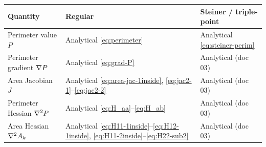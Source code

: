 \documentclass[11pt,a4paper]{article}
\begin{document}
\begin{center}
\renewcommand{\arraystretch}{1.35}
\begin{tabular}{p{4.2cm}p{4.5cm}p{4.5cm}}
\toprule
\textbf{Quantity} & \textbf{Regular} & \textbf{Steiner / triple-point} \\
\midrule
Perimeter value $P$
  & Analytical \eqref{eq:perimeter}
  & Analytical \eqref{eq:steiner-perim} \\
Perimeter gradient $\nabla P$
  & Analytical \eqref{eq:grad-P}
  & Analytical (doc 03) \\
Area Jacobian $J$
  & Analytical \eqref{eq:area-jac-1inside}, \eqref{eq:jac2-1}--\eqref{eq:jac2-2}
  & Analytical (doc 03) \\
Perimeter Hessian $\nabla^2 P$
  & Analytical \eqref{eq:H_aa}--\eqref{eq:H_ab}
  & Analytical (doc 03) \\
Area Hessian $\nabla^2 A_k$
  & Analytical \eqref{eq:H11-1inside}--\eqref{eq:H12-1inside},
    \eqref{eq:H11-2inside}--\eqref{eq:H22-sub2}
  & Analytical (doc 03) \\
\bottomrule
\end{tabular}
\end{center}



\end{document}
